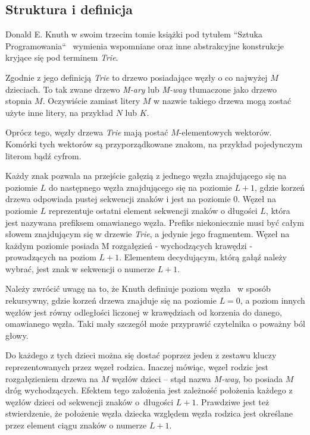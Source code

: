 		\subsection{Struktura i definicja}\label{sec:czescTeoretycznaPrzegladDrzewTrieStruktura}	
		Donald E. Knuth w swoim trzecim tomie książki pod tytułem ``Sztuka Programowania``~\cite{KnuthsTheArtOfComputerProgramming3} wymienia wspomniane oraz inne abstrakcyjne konstrukcje kryjące się pod terminem \emph{Trie}.
		
		Zgodnie z jego definicją \emph{Trie} to drzewo posiadające węzły o co najwyżej $M$ dzieciach. To tak zwane drzewo \emph{M-ary} \cite{wikiMAry} lub \emph{M-way} tłumaczone jako drzewo stopnia $M$. Oczywiście zamiast litery $M$ w nazwie takiego drzewa mogą zostać użyte inne litery, na przykład $N$ lub $K$. 
		
		Oprócz tego, węzły drzewa \emph{Trie} mają postać $M$-elementowych wektorów. Komórki tych wektorów są przyporządkowane znakom, na przykład pojedynczym literom bądź cyfrom. 
		
		Każdy znak pozwala na przejście gałęzią z jednego węzła znajdującego się na poziomie $L$ do następnego węzła znajdującego się na poziomie $L+1$, gdzie korzeń drzewa odpowiada pustej sekwencji znaków i jest na poziomie $0$. Węzeł na poziomie $L$ reprezentuje ostatni element sekwencji znaków o długości $L$, która jest nazywana prefiksem omawianego węzła. Prefiks niekoniecznie musi być całym słowem znajdującym się w drzewie \emph{Trie}, a jedynie jego fragmentem. Węzeł na każdym poziomie posiada M rozgałęzień - wychodzących krawędzi - prowadzących na poziom $L+1$. Elementem decydującym, którą gałąź należy wybrać, jest znak w sekwencji o numerze $L+1$. 
	
        Należy zwrócić uwagę na to, że Knuth definiuje poziom węzła~\cite{KnuthsTheArtOfComputerProgramming1} w sposób rekursywny, gdzie korzeń drzewa znajduje się na poziomie $L = 0$, a poziom innych węzłów jest równy odległości liczonej w krawędziach od korzenia do danego, omawianego węzła. Taki mały szczegół może przyprawić czytelnika o poważny ból głowy.
		
    	Do każdego z tych dzieci można się dostać poprzez jeden z zestawu kluczy reprezentowanych przez węzeł rodzica. Inaczej mówiąc, węzeł rodzic jest rozgałęzieniem drzewa na $M$ węzłów dzieci -- stąd nazwa \emph{M-way}, bo posiada $M$ dróg wychodzących. Efektem tego założenia jest zależność położenia każdego z węzłów dzieci od sekwencji znaków o~długości $L+1$. Prawdziwe jest też stwierdzenie, że położenie węzła dziecka względem węzła rodzica jest określane przez element ciągu znaków o numerze $L+1$.
    	
